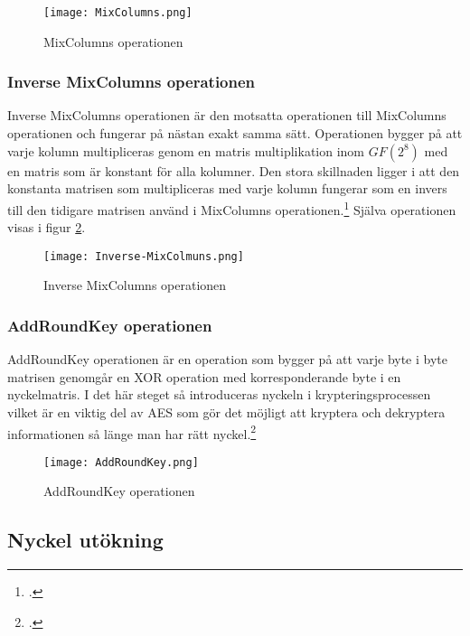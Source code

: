 \begin{figure}[H]
    \centering
    \texttt{[image: MixColumns.png]}
    \caption{MixColumns operationen}
    \label{fig:aes-mixcolumns-pic}
\end{figure}

\subsubsection{Inverse MixColumns operationen}
\label{sec:aes-invers-mixcolumns}

Inverse MixColumns operationen är den motsatta operationen till MixColumns operationen och fungerar på nästan exakt samma sätt. Operationen bygger på att varje kolumn multipliceras genom en
matris multiplikation inom \hyperref[sec:finite-fields]{$GF(2^8)$} med en matris som är konstant för alla kolumner. Den stora skillnaden ligger i att den konstanta matrisen som multipliceras med varje kolumn fungerar
som en invers till den tidigare matrisen använd i MixColumns operationen.\footcite{daemen1999aes} Själva operationen visas i figur \ref{fig:aes-inverse-mixcolumns-pic}.

\begin{figure}[H]
    \centering
    \texttt{[image: Inverse-MixColmuns.png]}
    \caption{Inverse MixColumns operationen}
    \label{fig:aes-inverse-mixcolumns-pic}
\end{figure}

\subsubsection{AddRoundKey operationen}
\label{sec:aes-addroundkey}

AddRoundKey operationen är en operation som bygger på att varje \gls{byte} i \gls{byte} matrisen genomgår en XOR operation med korresponderande \gls{byte} i en nyckelmatris.
I det här steget så introduceras nyckeln i krypteringsprocessen vilket är en viktig del av AES som gör det möjligt att kryptera och dekryptera informationen så länge man har rätt nyckel.\footcite{daemen1999aes}

\begin{figure}[H]
    \centering
    \texttt{[image: AddRoundKey.png]}
    \caption{AddRoundKey operationen}
    \label{fig:aes-addroundkey-pic}
\end{figure}

\pagebreak
\subsection{Nyckel utökning}
\label{sec:aes-key-expansion}


